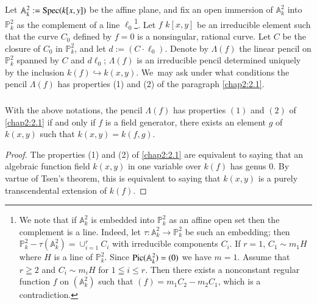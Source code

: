 \subsection{}\label{chap2:2.4}
Let $\mathbb{A}^{2}_{k}:=\operatorname{Spec}(k[x,y])$ be the affine plane, and fix
an open immersion of $\mathbb{A}^{2}_{k}$ into $\mathbb{P}^{2}_{k}$ as
the complement of a line $\ell_{0}$\footnote{We note that if
  $\mathbb{A}^{2}_{k}$ is embedded into $\mathbb{P}^{2}_{k}$ as an
  affine open set then the complement is a line. Indeed, let
  $\tau:\mathbb{A}^{2}_{k}\to \mathbb{P}^{2}_{k}$ be such an
  embedding; then
  $\mathbb{P}^{2}_{k}-\tau(\mathbb{A}^{2}_{k})=\cup^{r}_{i=1}C_{i}$
  with irreducible components $C_{i}$. If $r=1$, $C_{1}\sim m_{1}H$
  where $H$ is a line of $\mathbb{P}^{2}_{k}$. Since
  $\operatorname{Pic}(\mathbb{A}^{2}_{k})=(0)$ we have $m=1$. Assume that $r\geqq 2$
and $C_{i}\sim m_{i}H$ for $1\leqq i\leq r$. Then there exists a
nonconstant regular function $f$ on $(\mathbb{A}^{2}_{k})$ such that
$(f)=m_{1}C_{2}-m_{2}C_{1}$, which is a contradiction.}. Let $f$
$k[x,y]$ be an irreducible element such that the curve $C_{0}$ defined
by $f=0$ is a nonsingular, rational curve. Let $C$ be the closure of
$C_{0}$ in $\mathbb{P}^{2}_{k}$, and let $d:=(C\cdot\ell_{0})$. Denote
by $\Lambda(f)$ the linear pencil on $\mathbb{P}^{2}_{k}$ spanned by
$C$ and $d\ell_{0}$; $\Lambda(f)$ is an irreducible pencil determined
uniquely by the inclusion $k(f)\hookrightarrow
k(x,y)$. We\pageoriginale\ may ask under what conditions the pencil
$\Lambda(f)$ has properties (1) and (2) of the paragraph \ref{chap2:2.1}.

\subsubsection{}\label{chap2:2.4.1}
\begin{lemma*}
  With the above notations, the pencil $\Lambda(f)$ has properties $(1)$
  and $(2)$ of \ref{chap2:2.1} if and only if $f$ is a field generator, \iec
  there exists an element $g$ of $k(x,y)$ such that $k(x,y)=k(f,g)$.
\end{lemma*}

\begin{proof}
The properties (1) and (2) of \ref{chap2:2.1} are equivalent to saying that
an algebraic function field $k(x,y)$ in one variable over $k(f)$ has
genus $0$. By vartue of Tsen's theorem, this is equivalent to saying
that $k(x,y)$ is a purely transcendental extension of $k(f)$.
\end{proof}

